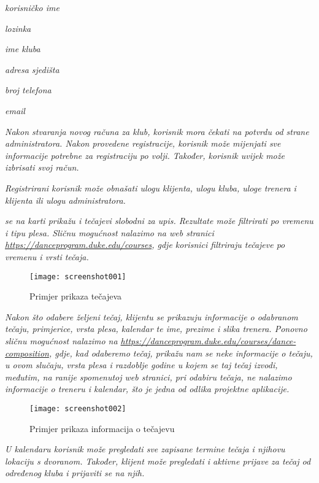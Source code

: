 \begin{packed_item}
	\item \textit{korisničko ime}
	\item \textit{lozinka}
	\item \textit{ime kluba}
	\item \textit{adresa sjedišta}
	\item \textit{broj telefona}
	\item \textit{email}
\end{packed_item}

\textit{Nakon stvaranja novog računa za klub, korisnik mora čekati na potvrdu od strane administratora.  Nakon provedene registracije, korisnik može mijenjati sve informacije potrebne za registraciju po volji. Također, korisnik uvijek može izbrisati svoj račun.}

\textit{Registrirani korisnik može obnašati ulogu klijenta, ulogu kluba, uloge trenera i klijenta ili ulogu administratora.}

\textit{ se na karti prikažu i tečajevi slobodni za upis. Rezultate može filtrirati po vremenu i tipu plesa. Sličnu mogućnost nalazimo na web stranici \url{https://danceprogram.duke.edu/courses}, gdje korisnici filtriraju tečajeve po vremenu i vrsti tečaja.}

\begin{figure}[H]
	\centering
	\texttt{[image: screenshot001]}
	\caption{Primjer prikaza tečajeva}
	\label{fig:screenshot001}
\end{figure}

\textit{Nakon što odabere željeni tečaj, klijentu se prikazuju informacije o odabranom tečaju, primjerice, vrsta plesa, kalendar te ime, prezime i slika trenera. Ponovno sličnu mogućnost nalazimo na \url{https://danceprogram.duke.edu/courses/dance-composition}, gdje, kad odaberemo tečaj, prikažu nam se neke informacije o tečaju, u ovom slučaju, vrsta plesa i razdoblje godine u kojem se taj tečaj izvodi, međutim, na ranije spomenutoj web stranici, pri odabiru tečaja, ne nalazimo informacije o treneru i kalendar, što je jedna od odlika projektne aplikacije.}

\begin{figure}[H]
	\centering
	\texttt{[image: screenshot002]}
	\caption{Primjer prikaza informacija o tečajevu}
	\label{fig:screenshot002}
\end{figure}

\textit{ U kalendaru korisnik može pregledati sve zapisane termine tečaja i njihovu lokaciju s dvoranom. Također, klijent može pregledati i aktivne prijave za tečaj od određenog kluba i prijaviti se na njih.}


